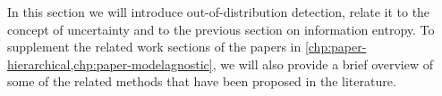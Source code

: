 

In this section we will introduce out-of-distribution detection, relate it to the concept of uncertainty and to the previous section on information entropy.
To supplement the related work sections of the papers in \cref{chp:paper-hierarchical,chp:paper-modelagnostic}, we will also provide a brief overview of some of the related methods that have been proposed in the literature. 

